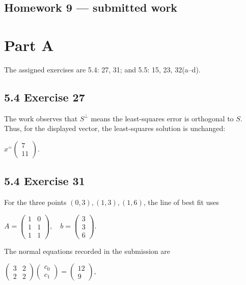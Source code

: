 \section{Homework 9 --- submitted work}

\chapter{Part A}

The assigned exercises are 5.4: 27, 31; and 5.5: 15, 23, 32(a--d).

\section{5.4 Exercise 27}

The work observes that \(S^{\perp}\) means the least-squares error is orthogonal to \(S\). Thus, for the displayed vector, the least-squares solution is unchanged:

\(x^{=}\begin{pmatrix}
7 \\
11
\end{pmatrix}.\)

\section{5.4 Exercise 31}

For the three points \(\left( {0,3} \right),\left( {1,3} \right),\left( {1,6} \right)\), the line of best fit uses

\(A = \begin{pmatrix}
1 & 0 \\
1 & 1 \\
1 & 1
\end{pmatrix},\quad b = \begin{pmatrix}
3 \\
3 \\
6
\end{pmatrix}.\)

The normal equations recorded in the submission are

\(\begin{pmatrix}
3 & 2 \\
2 & 2
\end{pmatrix}\begin{pmatrix}
c_{0} \\
c_{1}
\end{pmatrix} = \begin{pmatrix}
12 \\
9
\end{pmatrix},\)

